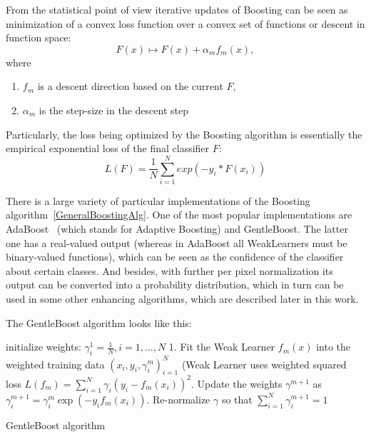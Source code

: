 From the statistical point of view iterative updates of Boosting can be seen as minimization of a convex loss function 
over a convex set of functions or descent in function space:
\begin{equation}
 F(x) \mapsto F(x) + \alpha_m f_m(x),
\end{equation}
where 
\begin{enumerate}
 \item $f_m$ is a descent direction based on the current $F$,
 \item $\alpha_m$ is the step-size in the descent step
\end{enumerate}
Particularly, the loss being optimized by the Boosting algorithm is essentially the empirical exponential loss of the
final classifier $F$:
\begin{equation}
 L(F) = \frac{1}{N}\sum_{i=1}^N exp{(-y_i*F(x_i))}
\end{equation}

There is a large variety of particular implementations of the Boosting algorithm~\ref{GeneralBoostingAlg}. One of the most popular
implementations are AdaBoost~\cite{Freund1996} (which stands for Adaptive Boosting) and GentleBoost. The latter one has a 
real-valued output (whereas in AdaBoost all WeakLearners must be binary-valued functions), which can be seen as the 
confidence of the classifier about certain classes. And besides, with further per pixel normalization its output can be 
converted into a probability distribution, which in turn can be used in some other enhancing algorithms, which are 
described later in this work.

The GentleBoost algorithm looks like this:

\begin{algorithm}[H]
  \label{GentleBoostAlg}
 \SetAlgoLined
 initialize weights: $\gamma_i^1 = \frac{1}{N}, i = 1, \dotsc, N$\;
 {
  1. Fit the Weak Learner $f_m(x)$ into the weighted training data ${(x_i, y_i, \gamma_i^m)}_{i=1}^N$
  (Weak Learner uses weighted squared loss $L(f_m) = \sum_{i=1}^{N}\gamma_i {(y_i - f_m(x_i))}^2$. Update the weights $\gamma^{m+1}$ as\\
  $\gamma_i^{m+1} = \gamma_i^m \exp{(-y_i f_m(x_i))}$. Re-normalize $\gamma$ so that $\sum_{i=1}^{N}\gamma_i^{m+1} = 1$\;
 }
 \caption{GentleBoost algorithm}
\end{algorithm}

